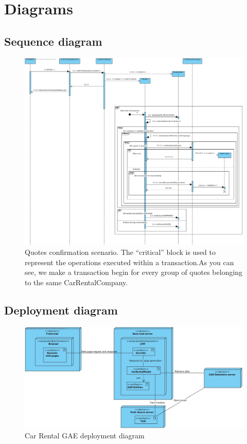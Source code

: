 \section{Diagrams}

\subsection{Sequence diagram}

\begin{figure}[h]
	\includegraphics[scale=0.35]{images/SequenceDiagram}
	\caption{Quotes confirmation scenario. The ``critical'' block is used to represent the operations executed within a transaction.As you can see, we make a transaction begin for every group of quotes belonging to the same CarRentalCompany.}
\end{figure}

\newpage
\subsection{Deployment diagram}
\begin{figure}[h]
	\includegraphics[scale=0.4]{images/DeploymentDiagram}
	\caption{Car Rental GAE deployment diagram}
\end{figure}